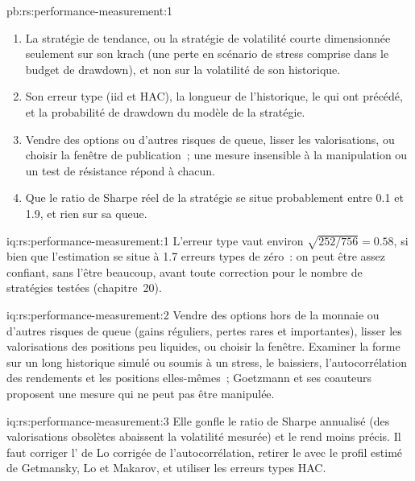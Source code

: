 \begin{solution}{pb:rs:performance-measurement:1}
\begin{enumerate}
\item La stratégie de tendance, ou la stratégie de volatilité courte dimensionnée seulement sur son krach (une perte en scénario de stress comprise dans le budget de drawdown), et non sur la volatilité de son historique.
\item Son erreur type (iid et HAC), la longueur de l'historique, le  qui ont précédé, et la probabilité de drawdown du modèle de la stratégie.
\item Vendre des options ou d'autres risques de queue, lisser les valorisations, ou choisir la fenêtre de publication~; une mesure insensible à la manipulation ou un test de résistance répond à chacun.
\item Que le ratio de Sharpe réel de la stratégie se situe probablement entre 0.1 et 1.9, et rien sur sa queue.
\end{enumerate}
\end{solution}

\begin{solution}{iq:rs:performance-measurement:1}
L'erreur type vaut environ $\sqrt{252/756} = 0.58$, si bien que l'estimation se situe à 1.7 erreurs types de zéro~: on peut être assez confiant, sans l'être beaucoup, avant toute correction
pour le nombre de stratégies testées (chapitre~20).
\end{solution}

\begin{solution}{iq:rs:performance-measurement:2}
Vendre des options hors de la monnaie ou d'autres risques de queue (gains réguliers, pertes rares et importantes), lisser les valorisations des positions peu liquides, ou choisir la fenêtre. Examiner la
forme sur un long historique simulé ou soumis à un stress, le  baissiers, l'autocorrélation des rendements et les positions elles-mêmes~; Goetzmann et ses coauteurs
proposent une mesure qui ne peut pas être manipulée.
\end{solution}

\begin{solution}{iq:rs:performance-measurement:3}
Elle gonfle le ratio de Sharpe annualisé (des valorisations obsolètes abaissent la volatilité mesurée) et le rend moins précis. Il faut corriger
l' de Lo corrigée de l'autocorrélation, retirer le  avec le profil estimé de Getmansky, Lo et Makarov, et utiliser les erreurs types HAC.
\end{solution}

